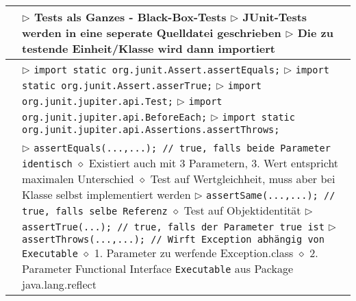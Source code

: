 	\begin{tabular}{ | p{} p{} | }
	\hline

	\makecell[l]{Allgemein} & \makecell[l]{
	$\triangleright$ Tests als Ganzes - Black-Box-Tests \\
	$\triangleright$ JUnit-Tests werden in eine seperate Quelldatei geschrieben \\
	$\triangleright$ Die zu testende Einheit/Klasse wird dann importiert } \\ \hline

	\makecell[l]{Imports} & \makecell[l]{
	$\triangleright$ \texttt{import static org.junit.Assert.assertEquals;} \\
	$\triangleright$ \texttt{import static org.junit.Assert.asserTrue;} \\
	$\triangleright$ \texttt{import org.junit.jupiter.api.Test;} \\
	$\triangleright$ \texttt{import org.junit.jupiter.api.BeforeEach;} \\
	$\triangleright$ \texttt{import static org.junit.jupiter.api.Assertions.assertThrows;}} \\ \hline

	\makecell[l]{Methoden:} & \makecell[l]{
	$\triangleright$ \texttt{assertEquals(...,...); // \texttt{true}, falls beide Parameter identisch} \\
    \hspace{0.4cm} $\diamond$ Existiert auch mit 3 Parametern, 3. Wert entspricht maximalen Unterschied \\ 
    \hspace{0.4cm} $\diamond$ Test auf Wertgleichheit, muss aber bei Klasse selbst implementiert werden \\
    $\triangleright$ \texttt{assertSame(...,...); // \texttt{true}, falls selbe Referenz} \\
    \hspace{0.4cm} $\diamond$ Test auf Objektidentität \\
	$\triangleright$ \texttt{assertTrue(...); // \texttt{true}, falls der Parameter \texttt{true} ist} \\
	$\triangleright$ \texttt{assertThrows(...,...); // Wirft Exception abhängig von Executable} \\
	\hspace{0.4cm} $\diamond$ 1. Parameter zu werfende Exception.class \\
	\hspace{0.4cm} $\diamond$ 2. Parameter Functional Interface \texttt{Executable} aus Package java.lang.reflect } \\ \hline
	

\end{tabular}

